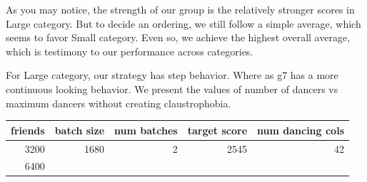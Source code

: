 As you may notice, the strength of our group is the relatively stronger
scores in Large category. But to decide an ordering, we still follow a
simple average, which seems to favor Small category. Even so, we achieve
the highest overall average, which is testimony to our performance
across categories.

For Large category, our strategy has step behavior. Where as g7 has a
more continuous looking behavior. We present the values of number of
dancers vs maximum dancers without creating claustrophobia.

\begin{longtable}[c]{@{}rrrrr@{}}
\toprule
\begin{minipage}[b]{0.12\columnwidth}\raggedleft\strut
friends
\strut\end{minipage} &
\begin{minipage}[b]{0.16\columnwidth}\raggedleft\strut
batch size
\strut\end{minipage} &
\begin{minipage}[b]{0.17\columnwidth}\raggedleft\strut
num batches
\strut\end{minipage} &
\begin{minipage}[b]{0.18\columnwidth}\raggedleft\strut
target score
\strut\end{minipage} &
\begin{minipage}[b]{0.23\columnwidth}\raggedleft\strut
num dancing cols
\strut\end{minipage}\tabularnewline
\midrule
\endhead
\begin{minipage}[t]{0.12\columnwidth}\raggedleft\strut
3200
\strut\end{minipage} &
\begin{minipage}[t]{0.16\columnwidth}\raggedleft\strut
1680
\strut\end{minipage} &
\begin{minipage}[t]{0.17\columnwidth}\raggedleft\strut
2
\strut\end{minipage} &
\begin{minipage}[t]{0.18\columnwidth}\raggedleft\strut
2545
\strut\end{minipage} &
\begin{minipage}[t]{0.23\columnwidth}\raggedleft\strut
42
\strut\end{minipage}\tabularnewline
\begin{minipage}[t]{0.12\columnwidth}\raggedleft\strut
6400
\strut\end{minipage} &
\begin{minipage}[t]{0.16\columnwidth}\raggedleft\strut

\end{minipage}
\end{longtable}
